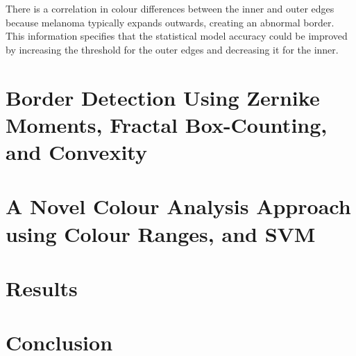 There is a correlation in colour differences between the inner and outer edges because melanoma typically expands outwards, creating an abnormal border. This information specifies that the statistical model accuracy could be improved by increasing the threshold for the outer edges and decreasing it for the inner.

\section{Border Detection Using Zernike Moments, 
Fractal Box-Counting, and Convexity}

\section{A Novel Colour Analysis Approach using Colour Ranges, and SVM}

\section{Results}

\section{Conclusion}





